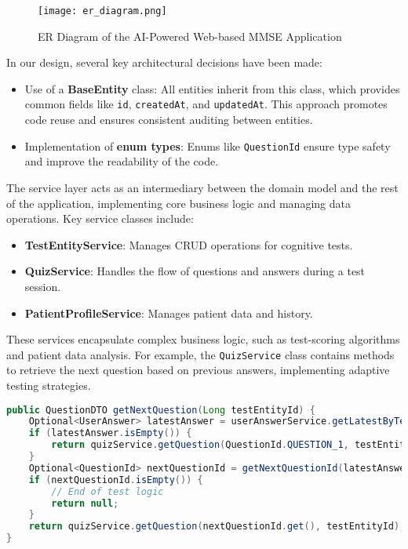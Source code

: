 \begin{figure}[h!]
\begin{center}
\texttt{[image: er\_diagram.png]}
\caption{ER Diagram of the AI-Powered Web-based MMSE Application}
\label{fig:er_diagram}
\end{center}
\end{figure}

In our design, several key architectural decisions have been made:
\begin{itemize}
    \item Use of a \textbf{BaseEntity} class: All entities inherit from this class, which provides common fields like \texttt{id}, \texttt{createdAt}, and \texttt{updatedAt}. This approach promotes code reuse and ensures consistent auditing between entities.
    \item Implementation of \textbf{enum types}: Enums like \texttt{QuestionId} ensure type safety and improve the readability of the code.
\end{itemize}

The service layer acts as an intermediary between the domain model and the rest of the application, implementing core business logic and managing data operations. Key service classes include:
\begin{itemize}
    \item \textbf{TestEntityService}: Manages CRUD operations for cognitive tests.
    \item \textbf{QuizService}: Handles the flow of questions and answers during a test session.
    \item \textbf{PatientProfileService}: Manages patient data and history.
\end{itemize}

These services encapsulate complex business logic, such as test-scoring algorithms and patient data analysis. For example, the \texttt{QuizService} class contains methods to retrieve the next question based on previous answers, implementing adaptive testing strategies.

\begin{lstlisting}[language=Java, caption=QuizService adaptive testing method]
public QuestionDTO getNextQuestion(Long testEntityId) {
    Optional<UserAnswer> latestAnswer = userAnswerService.getLatestByTestEntityId(testEntityId);
    if (latestAnswer.isEmpty()) {
        return quizService.getQuestion(QuestionId.QUESTION_1, testEntityId);
    }
    Optional<QuestionId> nextQuestionId = getNextQuestionId(latestAnswer.get().getQuestionId());
    if (nextQuestionId.isEmpty()) {
        // End of test logic
        return null;
    }
    return quizService.getQuestion(nextQuestionId.get(), testEntityId);
}
\end{lstlisting}

